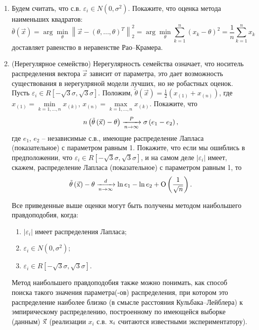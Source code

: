 \begin{problem}
\begin{enumerate}
\item Будем считать, что с.в. $\varepsilon _{i} \in N\left(0,\sigma ^{2} \right)$. Покажите, что оценка метода наименьших квадратов:
\[\bar{\theta }\left(\vec{x}\right)=\arg \mathop{\min }\limits_{\theta } \left\| \vec{x}-\left(\theta ,...,\theta \right)^{T} \right\| _{2}^{2} =\arg \mathop{\min }\limits_{\theta } \sum _{k=1}^{n}\left(x_{k} -\theta \right)^{2} = \frac{1}{n} \sum _{k=1}^{n}x_{k}  \] 
доставляет равенство в неравенстве Рао--Крамера.

\item (Нерегулярное семейство) Нерегулярность семейства означает, что носитель распределения вектора $\vec{x}$ зависит от параметра, это дает возможность существования в нерегулряной модели лучших, но не робастных оценок. Пусть $\varepsilon _{i} \in R\left[-\sqrt{3} \sigma ,\sqrt{3} \sigma \right]$. Положим, $\tilde{\theta }\left(\vec{x}\right)=\frac{1}{2} \left(x_{\left(1\right)} +x_{\left(n\right)} \right)$, где $x_{\left(1\right)} =\mathop{\min }\limits_{k=1,...,n} x_{\left(k\right)} $, $x_{\left(n\right)} =\mathop{\max }\limits_{k=1,...,n} x_{\left(k\right)} $. Покажите, что 
\[n\left(\tilde{\theta }\left(\vec{{\rm x}}\right)-\theta \right)\xrightarrow[{n\to \infty }]{P} \sigma \left(e_{1} -e_{2} \right),\] 
где $e_{1} $, $e_{2} $ -- независимые с.в., имеющие распределение Лапласа (показательное) с параметром равным 1. Покажите, что если мы ошиблись в предположении, что $\varepsilon _{i} \in R\left[-\sqrt{3} \sigma ,\sqrt{3} \sigma \right]$, и на самом деле $\left|\varepsilon _{i} \right|$ имеет, скажем, распределение Лапласа (показательное) с параметром равным 1, то
\[\tilde{\theta }\left(\vec{{\rm x}}\right)-\theta \xrightarrow[{n\to \infty }]{d} \ln e_{1} -\ln e_{2} +{\rm O} \left(\frac{1}{\sqrt{n} } \right).\] 

\begin{remark} 
Все приведенные выше оценки могут быть получены методом наибольшего правдоподобия, когда:  
\begin{enumerate}
\item $\left|\varepsilon _{i} \right|$ имеет распределения Лапласа; 
\item $\varepsilon _{i} \in N\left(0,\sigma ^{2} \right)$; 
\item $\varepsilon _{i} \in R\left[-\sqrt{3} \sigma ,\sqrt{3} \sigma \right]$.
\end{enumerate}
Метод наибольшего правдоподобия также можно понимать, как способ поиска такого значения параметра(-ов) распределения, при котором это распределение наиболее близко (в смысле расстояния Кульбака--Лейблера) к эмпирическому распределению, построенному по имеющейся выборке (данным) $\vec{{\rm x}}$ (реализации $x_{i} $ с.в. ${\rm x}_{i} $ считаются известными экспериментатору).

\end{remark} 

\end{enumerate}
\end{problem}

